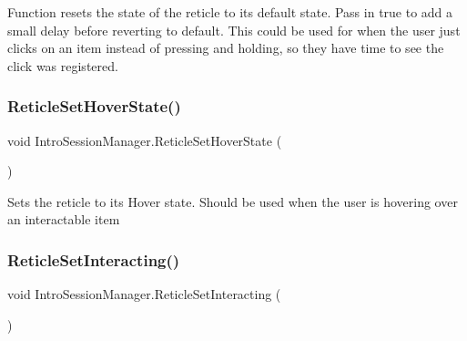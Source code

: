 Function resets the state of the reticle to its default state. Pass in true to add a small delay before reverting to default. This could be used for when the user just clicks on an item instead of pressing and holding, so they have time to see the click was registered. 

\mbox{\label{class_intro_session_manager_a31072153b257d37a5b1cd1566dd45d16}} 
\subsubsection{\texorpdfstring{Reticle\+Set\+Hover\+State()}{ReticleSetHoverState()}}
{\footnotesize\ttfamily void Intro\+Session\+Manager.\+Reticle\+Set\+Hover\+State (\begin{DoxyParamCaption}{ }\end{DoxyParamCaption})}



Sets the reticle to its Hover state. Should be used when the user is hovering over an interactable item 

\mbox{\label{class_intro_session_manager_aed37fcae779d3784743969ae0739c1c3}} 
\subsubsection{\texorpdfstring{Reticle\+Set\+Interacting()}{ReticleSetInteracting()}}
{\footnotesize\ttfamily void Intro\+Session\+Manager.\+Reticle\+Set\+Interacting (\begin{DoxyParamCaption}{ }\end{DoxyParamCaption})}

\mbox{\label{class_intro_session_manager_ad809a83bf76ede581699a9efd0280a4c}} 
